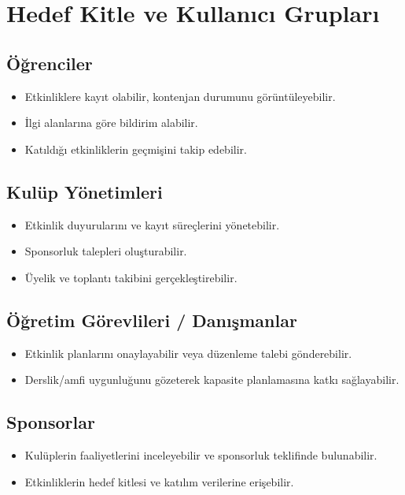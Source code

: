 \documentclass[a4paper,12pt]{report}
\begin{document}
\section{Hedef Kitle ve Kullanıcı Grupları}

\subsection{Öğrenciler}
\begin{itemize}
    \item Etkinliklere kayıt olabilir, kontenjan durumunu görüntüleyebilir.
    \item İlgi alanlarına göre bildirim alabilir.
    \item Katıldığı etkinliklerin geçmişini takip edebilir.
\end{itemize}

\subsection{Kulüp Yönetimleri}
\begin{itemize}
    \item Etkinlik duyurularını ve kayıt süreçlerini yönetebilir.
    \item Sponsorluk talepleri oluşturabilir.
    \item Üyelik ve toplantı takibini gerçekleştirebilir.
\end{itemize}

\subsection{Öğretim Görevlileri / Danışmanlar}
\begin{itemize}
    \item Etkinlik planlarını onaylayabilir veya düzenleme talebi gönderebilir.
    \item Derslik/amfi uygunluğunu gözeterek kapasite planlamasına katkı sağlayabilir.
\end{itemize}

\subsection{Sponsorlar}
\begin{itemize}
    \item Kulüplerin faaliyetlerini inceleyebilir ve sponsorluk teklifinde bulunabilir.
    \item Etkinliklerin hedef kitlesi ve katılım verilerine erişebilir.
\end{itemize}
\end{document}
